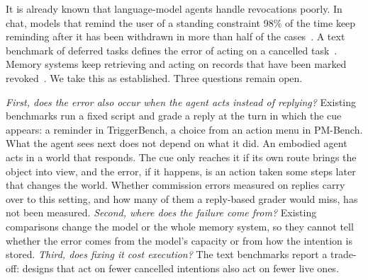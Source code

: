 

It is already known that language-model agents handle revocations poorly.
In chat, models that remind the user of a standing constraint 98\% of the
time keep reminding after it has been withdrawn in more than half of the
cases~\cite{zhang2026triggerbench}. A text benchmark of deferred tasks
defines the error of acting on a cancelled task~\cite{liu2026pmbench}.
Memory systems keep retrieving and acting on records that have been marked
revoked~\cite{shen2026revoked,yao2026forgetting}. We take this as
established. Three questions remain open.

\emph{First, does the error also occur when the agent acts instead of
replying?} Existing benchmarks run a fixed script and grade a reply at the
turn in which the cue appears: a reminder in TriggerBench, a choice from an
action menu in PM-Bench. What the agent sees next does not depend on what
it did. An embodied agent acts in a world that responds. The cue only
reaches it if its own route brings the object into view, and the error, if
it happens, is an action taken some steps later that changes the world.
Whether commission errors measured on replies carry over to this setting,
and how many of them a reply-based grader would miss, has not been
measured. \emph{Second, where does the failure come from?} Existing
comparisons change the model or the whole memory system, so they cannot
tell whether the error comes from the model's capacity or from how the
intention is stored. \emph{Third, does fixing it cost execution?} The text
benchmarks report a trade-off: designs that act on fewer cancelled
intentions also act on fewer live ones.

